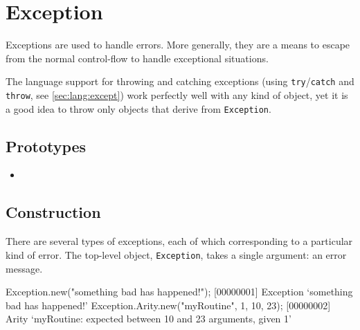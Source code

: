\section{Exception}

Exceptions are used to handle errors.  More generally, they are a
means to escape from the normal control-flow to handle exceptional
situations.

The language support for throwing and catching exceptions (using
\lstinline|try|/\lstinline|catch| and \lstinline|throw|, see
\autoref{sec:lang:except}) work perfectly well with any kind of
object, yet it is a good idea to throw only objects that derive from
\lstinline|Exception|.

\subsection{Prototypes}
\begin{itemize}
\item {}
\end{itemize}

\subsection{Construction}

There are several types of exceptions, each of which corresponding to
a particular kind of error.  The top-level object,
\lstinline|Exception|, takes a single argument: an error message.

\begin{urbiscript}[firstnumber=1]
Exception.new("something bad has happened!");
[00000001] Exception `something bad has happened!'
Exception.Arity.new("myRoutine", 1, 10, 23);
[00000002] Arity `myRoutine: expected between 10 and 23 arguments, given 1'
\end{urbiscript}


